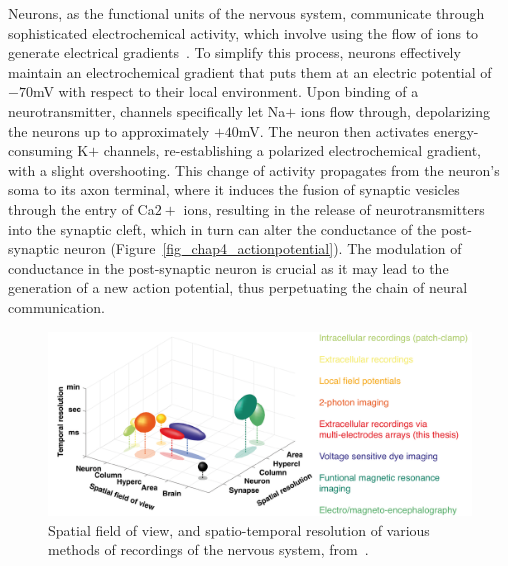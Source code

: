 Neurons, as the functional units of the nervous system, communicate through sophisticated electrochemical activity, which involve using the flow of ions to generate electrical gradients~\cite{kandel2000principles}. To simplify this process, neurons effectively maintain an electrochemical gradient that puts them at an electric potential of $-70$mV with respect to their local environment. Upon binding of a neurotransmitter, channels specifically let Na$+$ ions flow through, depolarizing the neurons up to approximately $+40$mV. The neuron then activates energy-consuming K$+$ channels, re-establishing a polarized electrochemical gradient, with a slight overshooting. This change of activity propagates from the neuron's soma to its axon terminal, where it induces the fusion of synaptic vesicles through the entry of Ca$2+$ ions, resulting in the release of neurotransmitters into the synaptic cleft, which in turn can alter the conductance of the post-synaptic neuron (Figure~\ref{fig_chap4_actionpotential}). The modulation of conductance in the post-synaptic neuron is crucial as it may lead to the generation of a new action potential, thus perpetuating the chain of neural communication.

\begin{figure}[h!tbp]
\vspace{0.1cm}
\centering
\includegraphics[width=1.\textwidth]{fig/chap4_chemla.pdf}
\caption[Methods of recording of the central nervous system.]{Spatial field of view, and spatio-temporal resolution of various methods of recordings of the nervous system, from~\cite{chemla2010voltage}.}
\label{fig_chap4_chemla}
\end{figure} 

